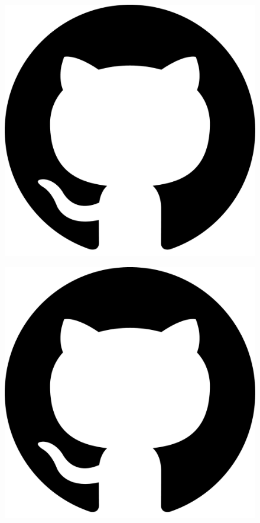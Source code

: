 \begin{figure}[b!]
\includegraphics[width=\textwidth]{./sponsors/github.pdf}
\end{figure}

\newpage


\begin{figure}
\includegraphics[width=\textwidth]{./sponsors/github.pdf}
\end{figure}
